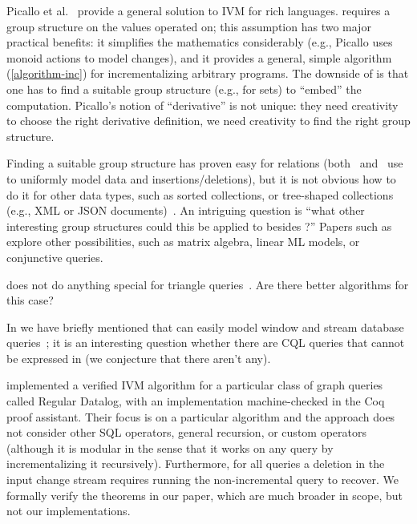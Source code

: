 Picallo et al.~\cite{picallo-scop19} provide a general solution to IVM for
rich languages.  \dbsp requires a group structure on the values operated on;
this assumption has two major practical benefits: it simplifies the mathematics considerably
(e.g., Picallo uses monoid actions to model changes), and it provides a general, simple
algorithm (\ref{algorithm-inc}) for incrementalizing arbitrary programs.  The downside of
\dbsp is that one has to find a suitable group structure (e.g., \zrs for sets) to ``embed''
the computation.  Picallo's notion of ``derivative'' is not unique: they need creativity to choose
the right derivative definition, we need creativity to find the right group structure.

Finding a suitable group structure has proven easy for relations (both~\cite{koch-pods10}
and~\cite{green-tcs11} use \zrs to uniformly model data and insertions/deletions), but it is
not obvious how to do it for other data types, such as sorted collections, or tree-shaped
collections (e.g., XML or JSON documents)~\cite{foster-planx08}.  An intriguing question
is ``what other interesting group structures could this be applied to besides \zrs?''
Papers such as~\cite{nikolic-icmd18} explore other possibilities, such as matrix algebra,
linear ML models, or conjunctive queries.

\dbsp does not do anything special for triangle queries~\cite{kara-tds20}.  Are there
better algorithms for this case?

In  we have briefly mentioned that \dbsp can easily
model window and stream database queries~\cite{arasu-tr02,aurora}; it is an
interesting question whether there are CQL queries that cannot be expressed in \dbsp
(we conjecture that there aren't any).

\citet{bonifati-iclp2018} implemented a verified IVM algorithm for a particular
class of graph queries called Regular Datalog, with an implementation machine-checked in the
Coq proof assistant. Their focus is on a particular algorithm and the approach does not
consider other SQL operators, general recursion, or custom operators (although it is modular
in the sense that it works on any query by incrementalizing it recursively). Furthermore,
for all queries a deletion in the input change stream requires running the non-incremental
query to recover.  We formally verify the theorems in our paper, which
are much broader in scope, but not our implementations.

